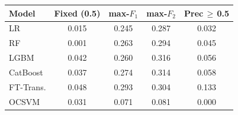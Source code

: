 \begin{tabular}{l c c c c}
\toprule
Model & Fixed (0.5) & max-$F_1$ & max-$F_2$ & Prec\,$\geq$\,0.5 \\
\midrule
LR         & 0.015 & 0.245 & 0.287 & 0.032 \\
RF         & 0.001 & 0.263 & 0.294 & 0.045 \\
LGBM       & 0.042 & 0.260 & 0.316 & 0.056 \\
CatBoost   & 0.037 & 0.274 & 0.314 & 0.058 \\
FT-Trans.  & 0.048 & 0.293 & 0.304 & 0.133 \\
OCSVM      & 0.031 & 0.071 & 0.081 & 0.000 \\
\bottomrule
\end{tabular}
